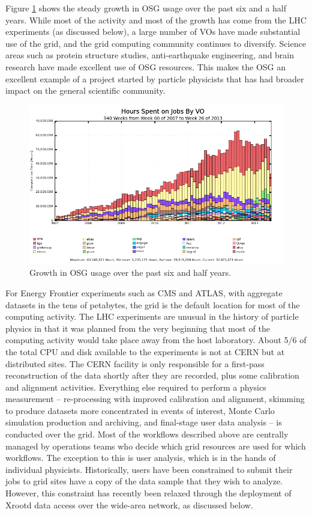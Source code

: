 Figure \ref{fig:OSG-growth} shows the steady growth in OSG usage over the past six and a half years.  While most of the activity and most of the growth has come from the LHC experiments (as discussed below), a large number of VOs have made substantial use of the grid, and the grid computing community continues to diversify.  Science areas such as protein structure studies, anti-earthquake engineering, and brain research have made excellent use of OSG resources.  This makes the OSG an excellent example of a project started by particle physicists that has had broader impact on the general scientific community. 

\begin{figure}[h]
\includegraphics[width=\textwidth]{CpF-I2/images/vo_hours_bar_smry.png}
\caption{Growth in OSG usage over the past six and half years.}
\label{fig:OSG-growth}
\end{figure}

For Energy Frontier experiments such as CMS and ATLAS, with aggregate datasets in the tens of petabytes, the grid is the default location for most of the computing activity.  The LHC experiments are unusual in the history of particle physics in that it was planned from the very beginning that most of the computing activity would take place away from the host laboratory.  About 5/6 of the total CPU and disk available to the experiments is not at CERN but at distributed sites.  The CERN facility is only responsible for a first-pass reconstruction of the data shortly after they are recorded, plus some calibration and alignment activities.  Everything else required to perform a physics measurement -- re-processing with improved calibration and alignment, skimming to produce datasets more concentrated in events of interest, Monte Carlo simulation production and archiving, and final-stage user data analysis -- is conducted over the grid.  Most of the workflows described above are centrally managed by operations teams who decide which grid resources are used for which workflows.  The exception to this is user analysis, which is in the hands of individual physicists.  Historically, users have been constrained to submit their jobs to grid sites have a copy of the data sample that they wish to analyze.  However, this constraint has recently been relaxed through the deployment of Xrootd data access over the wide-area network, as discussed below.

